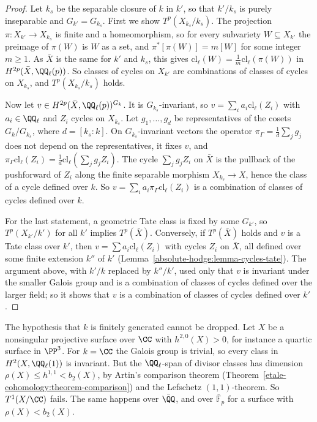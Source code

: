 \begin{proof}
Let $k_s$ be the separable closure of $k$ in $k'$, so that $k'/k_s$ is purely inseparable and $G_{k'} = G_{k_s}$. First we show $T^p(X_{k_s}/k_s)$. The projection $\pi \colon X_{k'} \to X_{k_s}$ is finite and a
homeomorphism, so for every subvariety $W \subseteq X_{k'}$ the preimage of $\pi(W)$ is $W$ as a set, and $\pi^*[\pi(W)] = m[W]$ for some integer $m \geq 1$. As $\bar X$ is the same for $k'$ and $k_s$, this gives
$\mathrm{cl}_\ell(W) = \frac1m\mathrm{cl}_\ell(\pi(W))$ in $H^{2p}(\bar X, \QQ_\ell(p))$. So classes of cycles on $X_{k'}$ are combinations of classes of cycles on $X_{k_s}$, and $T^p(X_{k_s}/k_s)$ holds.

Now let $v \in H^{2p}(\bar X, \QQ_\ell(p))^{G_k}$. It is $G_{k_s}$-invariant, so $v = \sum_ia_i\mathrm{cl}_\ell(Z_i)$ with $a_i \in \QQ_\ell$ and $Z_i$ cycles on $X_{k_s}$. Let $g_1, \ldots, g_d$ be representatives of the cosets
$G_k/G_{k_s}$, where $d = [k_s : k]$. On $G_{k_s}$-invariant vectors the operator $\pi_\Gamma = \frac1d\sum_jg_j$ does not depend on the representatives, it fixes $v$, and
$\pi_\Gamma\mathrm{cl}_\ell(Z_i) = \frac1d\mathrm{cl}_\ell(\sum_jg_jZ_i)$. The cycle $\sum_jg_jZ_i$ on $\bar X$ is the pullback of the pushforward of $Z_i$ along the finite separable morphism $X_{k_s} \to X$, hence
the class of a cycle defined over $k$. So $v = \sum_ia_i\pi_\Gamma\mathrm{cl}_\ell(Z_i)$ is a combination of classes of cycles defined over $k$.

For the last statement, a geometric Tate class is fixed by some $G_{k'}$, so $T^p(X_{k'}/k')$ for all $k'$ implies $T^p(\bar X)$. Conversely, if $T^p(\bar X)$ holds and $v$ is a Tate class over $k'$, then
$v = \sum a_i\mathrm{cl}_\ell(Z_i)$ with cycles $Z_i$ on $\bar X$, all defined over some finite extension $k''$ of $k'$ (Lemma~\ref{absolute-hodge:lemma-cycles-tate}). The argument above, with $k'/k$ replaced
by $k''/k'$, used only that $v$ is invariant under the smaller Galois group and is a combination of classes of cycles defined over the larger field; so it shows that $v$ is a combination of classes of
cycles defined over $k'$.
\end{proof}

\begin{counterexample}\label{absolute-hodge:counterexample-algebraically-closed}
The hypothesis that $k$ is finitely generated cannot be dropped. Let $X$ be a nonsingular projective surface over $\CC$ with $h^{2,0}(X) > 0$, for instance a quartic surface in $\PP^3$. For $k = \CC$ the Galois
group is trivial, so every class in $H^2(X, \QQ_\ell(1))$ is invariant. But the $\QQ_\ell$-span of divisor classes has dimension $\rho(X) \leq h^{1,1} < b_2(X)$, by Artin's comparison theorem
(Theorem~\ref{etale-cohomology:theorem-comparison}) and the Lefschetz $(1,1)$-theorem. So $T^1(X/\CC)$ fails. The same happens over $\bar{\QQ}$, and over $\bar{\mathbb{F}}_p$ for a surface with
$\rho(X) < b_2(X)$.
\end{counterexample}

